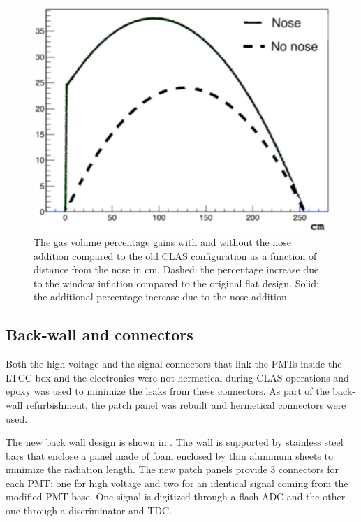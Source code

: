 \begin{figure}
	\centering
	\includegraphics[width=0.98\columnwidth, height=0.7\columnwidth]{img/noseVolume.png}
	\caption{The gas volume percentage gains with and without the nose addition compared to the old CLAS configuration as a function of
            distance from the nose in cm. Dashed: the percentage increase due to the window inflation compared to the original flat design.
            Solid: the additional percentage increase due to the nose addition.}
	\label{fig:noseVolume}
\end{figure}


\subsection{Back-wall and connectors}

Both the high voltage and the signal connectors that link the PMTs inside the LTCC box and the electronics were not
hermetical during CLAS operations and epoxy was used to minimize the leaks from these connectors.
As part of the back-wall refurbishment, the patch panel was rebuilt and hermetical connectors were used.

The new back wall design is shown in . The wall is supported by stainless steel bars that enclose a panel made of foam enclosed by
thin aluminum sheets to minimize the radiation length.
The new patch panels provide 3 connectors for each PMT: one for high voltage and two for an identical signal coming from the modified PMT base.
One signal is digitized through a flash ADC and the other one through a discriminator and TDC.

